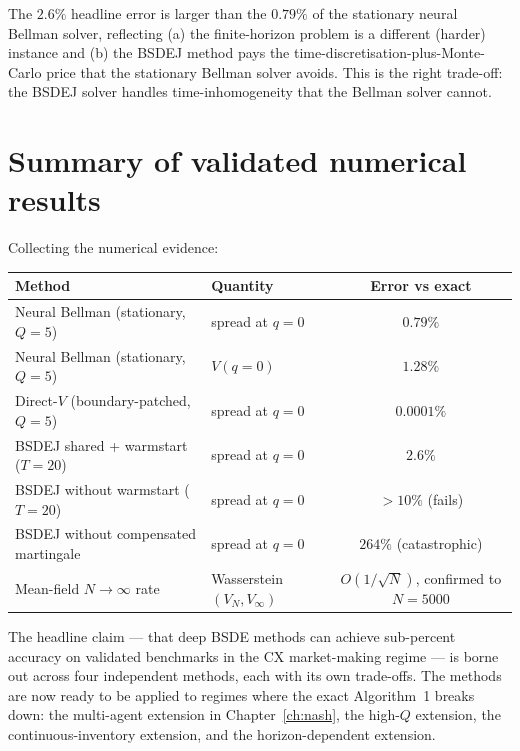 The $2.6\%$ headline error is larger than the $0.79\%$ of the stationary neural Bellman solver, reflecting (a) the finite-horizon problem is a different (harder) instance and (b) the BSDEJ method pays the time-discretisation-plus-Monte-Carlo price that the stationary Bellman solver avoids. This is the right trade-off: the BSDEJ solver handles time-inhomogeneity that the Bellman solver cannot.

\section{Summary of validated numerical results}

Collecting the numerical evidence:

\begin{table}[h]
\centering
\begin{tabular}{@{}llc@{}}
\toprule
Method & Quantity & Error vs exact \\ \midrule
Neural Bellman (stationary, $Q = 5$) & spread at $q = 0$ & $0.79\%$ \\
Neural Bellman (stationary, $Q = 5$) & $V(q = 0)$ & $1.28\%$ \\
Direct-$V$ (boundary-patched, $Q = 5$) & spread at $q = 0$ & $0.0001\%$ \\
BSDEJ shared + warmstart ($T = 20$) & spread at $q = 0$ & $2.6\%$ \\
BSDEJ without warmstart ($T = 20$) & spread at $q = 0$ & $> 10\%$ (fails) \\
BSDEJ without compensated martingale & spread at $q = 0$ & $264\%$ (catastrophic) \\
Mean-field $N \to \infty$ rate & Wasserstein$(V_N, V_\infty)$ & $O(1/\sqrt{N})$, confirmed to $N = 5000$ \\ \bottomrule
\end{tabular}
\end{table}

The headline claim --- that deep BSDE methods can achieve sub-percent accuracy on validated benchmarks in the CX market-making regime --- is borne out across four independent methods, each with its own trade-offs. The methods are now ready to be applied to regimes where the exact Algorithm~1 breaks down: the multi-agent extension in Chapter~\ref{ch:nash}, the high-$Q$ extension, the continuous-inventory extension, and the horizon-dependent extension.
